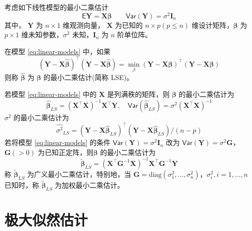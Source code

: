 \documentclass[12pt,a4paper,UTF8,twoside]{book}
\theoremstyle{definition}
\theoremstyle{definition}
\theoremstyle{definition}
\theoremstyle{remark}
\let\BeginKnitrBlock\begin \let\EndKnitrBlock\end
\begin{document}
考虑如下线性模型的最小二乘估计 \begin{equation}
\mathsf{E}\mathbf{Y} = \mathbf{X}\boldsymbol{\beta} \qquad \mathsf{Var}(\mathbf{Y}) = \sigma^2 \mathbf{I}_{n} \label{eq:linear-models}
\end{equation} \noindent 其中， \(\mathbf{Y}\) 为 \(n \times 1\)
维观测向量， \(\mathbf{X}\) 为已知的 \(n \times p (p \leq n)\)
维设计矩阵，\(\boldsymbol{\beta}\) 为 \(p \times 1\)
维未知参数，\(\sigma^2\) 未知，\(\mathbf{I}_{n}\) 为 \(n\) 阶单位阵。
\BeginKnitrBlock{definition}[最小二乘估计]
\protect\hypertarget{def:least-squares-estimate}{}{\label{def:least-squares-estimate}
{} }在模型 \eqref{eq:linear-models} 中，如果
\begin{equation}
(\mathbf{Y} - \mathbf{X}\hat{\boldsymbol{\beta}})^{\top}(\mathbf{Y} - \mathbf{X}\hat{\boldsymbol{\beta}}) = \min_{\beta}(\mathbf{Y} - \mathbf{X}\boldsymbol{\beta})^{\top}(\mathbf{Y} - \mathbf{X}\boldsymbol{\beta}) \label{eq:least-squares}
\end{equation} \noindent 则称 \(\hat{\boldsymbol{\beta}}\) 为
\(\boldsymbol{\beta}\) 的最小二乘估计(简称 LSE)\citep{wang2004}。
\EndKnitrBlock{definition}

\BeginKnitrBlock{theorem}[最小二乘估计]
\protect\hypertarget{thm:unbiased}{}{\label{thm:unbiased}
{} }若模型 \eqref{eq:linear-models} 中的
\(\mathbf{X}\) 是列满秩的矩阵，则 \(\boldsymbol{\beta}\)
的最小二乘估计为 \[
\hat{\boldsymbol{\beta}}_{LS} = ( \mathbf{X}^{\top}\mathbf{X} )^{-1}\mathbf{X}^{\top} \mathbf{Y}, \quad  \mathsf{Var}(\hat{\boldsymbol{\beta}}_{LS}) = \sigma^2 (\mathbf{X}^{\top}\mathbf{X})^{-1}  
\] \noindent \(\sigma^2\) 的最小二乘估计为 \[
\hat{\sigma^2}_{LS} = (\mathbf{Y} - \mathbf{X}\hat{\boldsymbol{\beta}}_{LS})^{\top}(\mathbf{Y} - \mathbf{X}\hat{\boldsymbol{\beta}}_{LS})/(n - p)
\] 若将模型 \eqref{eq:linear-models} 的条件
\(\mathsf{Var}(\mathbf{Y}) = \sigma^2 \mathbf{I}_{n}\) 改为
\(\mathsf{Var}(\mathbf{Y}) = \sigma^2 \mathbf{G}\)， \(\mathbf{G}(>0)\)
为已知正定阵，则\(\boldsymbol{\beta}\) 的最小二乘估计为 \[
\tilde{\boldsymbol{\beta}}_{LS} = ( \mathbf{X}^{\top} \mathbf{G}^{-1} \mathbf{X})^{-1} \mathbf{X}^{\top} \mathbf{G}^{-1} \mathbf{Y} 
\] \noindent 称 \(\tilde{\boldsymbol{\beta}}_{LS}\)
为广义最小二乘估计，特别地，当
\(\mathbf{G} = \mathrm{diag}(\sigma^2_{1},\ldots,\sigma^2_{n})\)，\(\sigma^2_{i},i = 1,\ldots,n\)
已知时，称 \(\tilde{\boldsymbol{\beta}}_{LS}\) 为加权最小二乘估计。
\EndKnitrBlock{theorem}

\hypertarget{sec:def-mle}{%
\section{极大似然估计}\label{sec:def-mle}}
\end{document}
